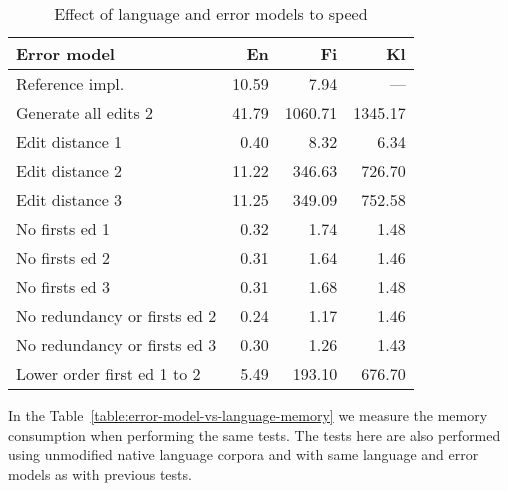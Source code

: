 \documentclass[11pt]{article}
\begin{document}
\begin{table}[h]
\begin{center}
\begin{scriptsize}
\begin{tabular}{|l|rrr|}
\hline
\bf Error model & \bf En & \bf Fi & \bf Kl \\ 
\hline
Reference impl. &
10.59&7.94
& --- \\
Generate all edits 2 & 
41.79&1060.71&1345.17
\\
\hline
Edit distance 1 &
0.40 &8.32&6.34
\\
Edit distance 2 &
11.22&346.63&726.70
\\
Edit distance 3 &
11.25&349.09&752.58
\\
No firsts ed 1 & 
0.32&1.74&1.48
\\
No firsts ed 2 &
0.31&1.64&1.46
\\
No firsts ed 3 &
0.31&1.68&1.48
\\
No redundancy or firsts ed 2 &
0.24&1.17&1.46
\\
No redundancy or firsts ed 3 &
0.30&1.26&1.43
\\
Lower order first ed 1 to 2 &
5.49&193.10&676.70
\\
\hline
\end{tabular}
\end{scriptsize}
\end{center}
\caption{\label{table:error-model-vs-language-speed} Effect of language and 
error models to speed}
\end{table}

In the Table~\ref{table:error-model-vs-language-memory} we measure the memory
consumption when performing the same tests. The tests here are also performed
using unmodified native language corpora and with same language and error
models as with previous tests.
\end{document}
